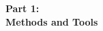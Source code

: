 \vspace*{60 mm}
\begin{center}
{\Huge{\textbf{Part 1:}}}\\
\vspace*{5 mm}
{\Huge{\textbf{Methods and Tools}}}
\end{center}
